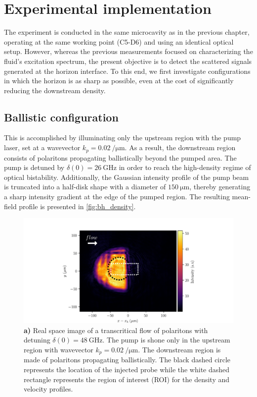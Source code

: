  \section{Experimental implementation}
 The experiment is conducted in the same microcavity as in the previous chapter, operating at the same working point (C5-D6) and using an identical optical setup. 
 However, whereas the previous measurements focused on characterizing the fluid's excitation spectrum, the present objective is to detect the scattered signals generated at the horizon interface. 
 To this end, we first investigate configurations in which the horizon is as sharp as possible, even at the cost of significantly reducing the downstream density. 
\label{sec:exp_implementation_scat_matrix}
\subsection{Ballistic configuration}
\label{sec:ballistic_configuration}
This is accomplished by illuminating only the upstream region with the pump laser, set at a wavevector \(k_p = \SI{0.02}{\per \micro \meter}\). As a result, the downstream region consists of polaritons propagating ballistically beyond the pumped area.
The pump is detuned by \(\delta(0) = \SI{26}{\giga \hertz}\) in order to reach the high-density regime of optical bistability. Additionally, the Gaussian intensity profile of the pump beam is truncated into a half-disk shape with a diameter of \(\SI{150}{\micro \meter}\), thereby generating a sharp intensity gradient at the edge of the pumped region. 
The resulting mean-field profile is presented in \autoref{fig:bh_density}.

\begin{figure}[htbp]
    \centering
    \includegraphics[width=1\textwidth]{chap_stimulated_hawking/fig/bh_density.pdf}
    \caption{\textbf{a)} Real space image of a transcritical flow of polaritons with detuning $\delta(0)=\SI{48}{\giga\hertz}$. The pump is shone only 
    in the upstream region with wavevector $k_p=\SI{0.02}{\per \micro \meter}$.
    The downstream region is made of polaritons propagating ballistically. The black dashed circle represents the location of the injected probe while the white dashed rectangle represents the region 
    of interest (ROI) for the density and velocity profiles. }
    \label{fig:bh_density}
\end{figure}

